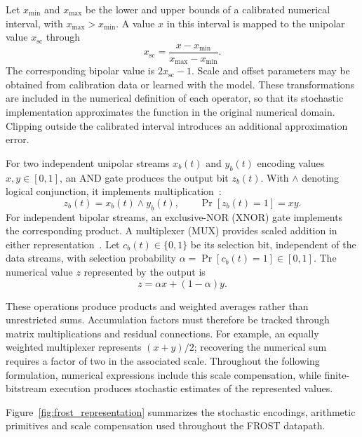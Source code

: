 \documentclass[pdflatex,sn-mathphys-num]{sn-jnl}
\theoremstyle{thmstyleone}
\theoremstyle{thmstyletwo}
\theoremstyle{thmstylethree}
\begin{document}
Let $x_{\min}$ and $x_{\max}$ be the lower and upper bounds of a calibrated numerical interval, with $x_{\max}>x_{\min}$. A value $x$ in this interval is mapped to the unipolar value $x_{\mathrm{sc}}$ through
\begin{equation}
x_{\mathrm{sc}} = \frac{x-x_{\min}}{x_{\max}-x_{\min}}. \label{eq:range_mapping}
\end{equation}
The corresponding bipolar value is $2x_{\mathrm{sc}}-1$. Scale and offset parameters may be obtained from calibration data or learned with the model. These transformations are included in the numerical definition of each operator, so that its stochastic implementation approximates the function in the original numerical domain. Clipping outside the calibrated interval introduces an additional approximation error.

For two independent unipolar streams $x_b(t)$ and $y_b(t)$ encoding values $x,y\in[0,1]$, an AND gate produces the output bit $z_b(t)$. With $\land$ denoting logical conjunction, it implements multiplication~\cite{alaghi2013survey}:
\begin{equation}
z_b(t)=x_b(t)\land y_b(t), \qquad \Pr\!\left[z_b(t)=1\right]=xy. \label{eq:unipolar_multiplication}
\end{equation}
For independent bipolar streams, an exclusive-NOR (XNOR) gate implements the corresponding product. A multiplexer (MUX) provides scaled addition in either representation~\cite{alaghi2013survey}. Let $c_b(t)\in\{0,1\}$ be its selection bit, independent of the data streams, with selection probability $\alpha=\Pr[c_b(t)=1]\in[0,1]$. The numerical value $z$ represented by the output is
\begin{equation}
z = \alpha x+(1-\alpha)y. \label{eq:stochastic_mux_addition}
\end{equation}

These operations produce products and weighted averages rather than unrestricted sums. Accumulation factors must therefore be tracked through matrix multiplications and residual connections. For example, an equally weighted multiplexer represents $(x+y)/2$; recovering the numerical sum requires a factor of two in the associated scale. Throughout the following formulation, numerical expressions include this scale compensation, while finite-bitstream execution produces stochastic estimates of the represented values.

Figure~\ref{fig:frost_representation} summarizes the stochastic
encodings, arithmetic primitives and scale compensation used
throughout the FROST datapath.
\end{document}
